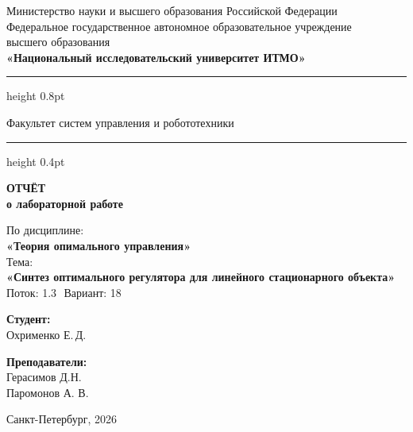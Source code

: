 \documentclass[a4paper,12pt]{article}
\begin{document}
	
	\begin{titlepage}
		\centering
		
		\vspace*{0.5cm}
		{\small
			Министерство науки и высшего образования Российской Федерации\\[2pt]
			Федеральное государственное автономное образовательное учреждение\\
			высшего образования\\[2pt]
			\textbf{«Национальный исследовательский университет ИТМО»}\\
		}
		
		\vspace{0.8cm}
		\hrule height 0.8pt
		\vspace{0.3cm}
		
		{\large Факультет систем управления и робототехники}
		
		\vspace{0.3cm}
		\hrule height 0.4pt
		\vspace{2.5cm}
		
		{\Huge\bfseries ОТЧЁТ}\\[0.4cm]
		{\LARGE\bfseries о лабораторной работе}\\[0.8cm]
		
		\begin{tcolorbox}[
			colback=gray!4,
			colframe=gray!10,
			boxrule=0.8pt,
			arc=4pt,
			left=12pt, right=12pt, top=8pt, bottom=8pt
			]
			\centering
			{\large По дисциплине:\\[4pt]}
			{\large\bfseries «Теория опимального управления»}\\[10pt]
			{\large Тема:\\[4pt]}
			{\large\bfseries «Синтез оптимального регулятора для линейного стационарного объекта»} \\[10pt]
			{\large Поток: 1.3 \( \) Вариант: 18}
		\end{tcolorbox}
		
		\vspace{3cm}
		
		\begin{minipage}{0.45\textwidth}
			\raggedright
			{\large\bfseries Студент:}\\[4pt]
			Охрименко Е.\,Д.\\
		\end{minipage}
		\hfill
		\begin{minipage}{0.45\textwidth}
			\raggedleft
			{\large\bfseries Преподаватели:}\\[4pt]
			Герасимов Д.Н.\\
			Паромонов А. В.
		\end{minipage}
		
		\vfill
		\vspace{0.4cm}
		{\large Санкт-Петербург, 2026}
	\end{titlepage}
	
\end{document}
